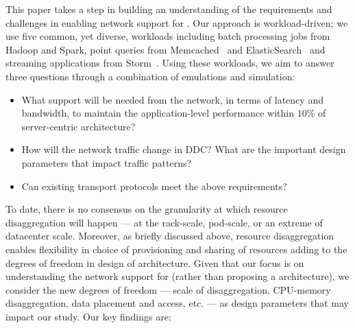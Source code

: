 This paper takes a step in building an understanding of the requirements and challenges in enabling network support for \dis. Our approach is workload-driven; we use five common, yet diverse, workloads including batch processing jobs from Hadoop and Spark, point queries from Memcached~\cite{memcached} and ElasticSearch~\cite{elastic} and streaming applications from Storm~\cite{storm}. Using these workloads, we aim to answer three questions through a combination of emulations and simulation: 

\begin{itemize}[leftmargin=*]
	\itemsep0em
		\item What support will be needed from the network, in terms of latency and bandwidth, to maintain the application-level performance within $10\%$ of server-centric architecture? 
	\item How will the network traffic change in DDC? What are the important design parameters that impact traffic patterns?
    \item Can existing transport protocols meet the above requirements? 
\end{itemize}

\noindent
To date, there is no consensus on the granularity at which resource disaggregation will happen --- at the rack-scale, pod-scale, or an extreme of datacenter scale. Moreover, as briefly discussed above, resource disaggregation enables flexibility in choice of provisioning and sharing of resources adding to the degrees of freedom in design of \dis architecture. Given that our focus is on understanding the network support for \dis (rather than proposing a \dis architecture), we consider the new degrees of freedom --- scale of disaggregation, CPU-memory disaggregation, data placement and access, etc. --- as design parameters that may impact our study. Our key findings are:


